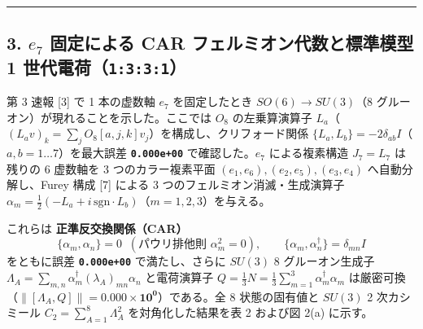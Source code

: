 \documentclass[
  a4paper,
]{ltjsarticle}
\begin{document}
\begin{center}\rule{0.5\linewidth}{0.5pt}\end{center}

\subsection{\texorpdfstring{3. \(e_7\) 固定による CAR
フェルミオン代数と標準模型 1
世代電荷（\texttt{1:3:3:1}）}{3. e\_7 固定による CAR フェルミオン代数と標準模型 1 世代電荷（1:3:3:1）}}\label{e_7-ux56faux5b9aux306bux3088ux308b-car-ux30d5ux30a7ux30ebux30dfux30aaux30f3ux4ee3ux6570ux3068ux6a19ux6e96ux6a21ux578b-1-ux4e16ux4ee3ux96fbux83771331}

第 3 速報 {[}3{]} で 1 本の虚数軸 \(e_7\) を固定したとき
\(SO(6) \to SU(3)\)（8 グルーオン）が現れることを示した。ここでは
\(O_8\) の左乗算演算子
\(L_a\)（\((L_a v)_k = \sum_j O_8[a, j, k] v_j\)）を構成し、クリフォード関係
\(\{L_a, L_b\} = -2\delta_{ab}I\)（\(a,b = 1 \dots 7\)）を最大誤差
\textbf{\texttt{0.000e+00}} で確認した。\(e_7\) による複素構造
\(J_7 = L_7\) は残りの 6 虚数軸を 3 つのカラー複素平面
\((e_1, e_6), (e_2, e_5), (e_3, e_4)\) へ自動分解し、Furey 構成 {[}7{]}
による 3 つのフェルミオン消滅・生成演算子
\(\alpha_m = \frac{1}{2}(-L_a + i\,\mathrm{sgn}\cdot L_b)\)（\(m=1,2,3\)）を与える。

これらは \textbf{正準反交換関係（CAR）}
\[\{\alpha_m, \alpha_n\} = 0 \;\;(\text{パウリ排他則 } \alpha_m^2 = 0), \qquad \{\alpha_m, \alpha_n^\dagger\} = \delta_{mn} I\]
をともに誤差 \textbf{\texttt{0.000e+00}} で満たし、さらに \(SU(3)\) 8
グルーオン生成子
\(\Lambda_A = \sum_{m,n} \alpha_m^\dagger (\lambda_A)_{mn} \alpha_n\)
と電荷演算子
\(Q = \frac{1}{3} N = \frac{1}{3}\sum_{m=1}^3 \alpha_m^\dagger \alpha_m\)
は厳密可換（\(\|[\Lambda_A, Q]\| = \mathbf{0.000\times 10^0}\)）である。全
8 状態の固有値と \(SU(3)\) 2 次カシミール
\(C_2 = \sum_{A=1}^8 \Lambda_A^2\) を対角化した結果を表 2 および図 2(a)
に示す。
\end{document}

